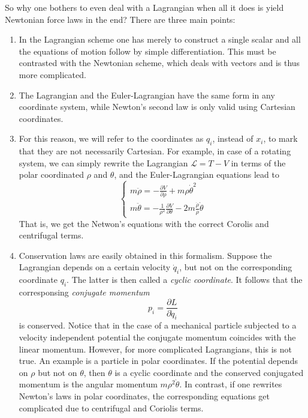 \documentclass[11pt,fleqn]{book} %
\begin{document}
So why one bothers to even deal with a Lagrangian when all it does is yield Newtonian force laws in the end? There are three main points:
\begin{enumerate}
    \item In the Lagrangian scheme one has merely to construct a single scalar and all the equations of motion follow by simple differentiation.
    This must be contrasted with the Newtonian scheme, which deals with vectors and is thus more complicated.
    \item The Lagrangian and the Euler-Lagrangian have the same form in any coordinate system, while Newton's second law is only valid using Cartesian coordinates.
    \item For this reason, we will refer to the coordinates as $q_i$, instead of $x_i$, to mark that they are not necessarily Cartesian.
    For example, in case of a rotating system, we can simply rewrite the Lagrangian $\mathcal{L}=T-V$ in terms of the polar coordinated $\rho$ and $\theta$, and the
    Euler-Lagrangian equations lead to
    \begin{equation*}
        \left\{\begin{array}{l}
            m\ddot{\rho} = -\frac{\partial V}{\partial \rho}+m\rho\dot{\theta}^2 \\
            m\ddot{\theta} = -\frac{1}{\rho^2}\frac{\partial V}{\partial\theta}-2m\frac{\dot{\rho}}{\rho}\dot{\theta}
        \end{array}\right.
    \end{equation*}
That is, we get the Netwon's equations with the correct Corolis and centrifugal terms.
\item Conservation laws are easily obtained in this formalism. Suppose the Lagrangian depends on a certain velocity $\dot{q}_i$, but not on the corresponding
coordinate $q_i$. The latter is then called a \textit{cyclic coordinate}. It follows that the corresponsing \textit{conjugate momentum}
\begin{equation*}
    p_i=\frac{\partial L}{\partial \dot{q}_i}
\end{equation*}
is conserved.
Notice that in the case of a mechanical particle subjected to a velocity independent potential the conjugate momentum coincides with the linear momentum. However, for
more complicated Lagrangians, this is not true. An example is a particle in polar coordinates. If the potential depends on $\rho$ but not on $\theta$, then $\theta$ is a
cyclic coordinate and the conserved conjugated momentum is the angular momentum $m\rho^2\dot{\theta}$. In contrast, if one rewrites Newton's laws in polar coordinates,
the corresponding equations get complicated due to centrifugal and Coriolis terms.
\end{enumerate}
\end{document}
